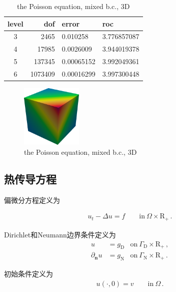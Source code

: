 \begin{table}[!htbp]\label{tab:4.1.1:2}
  \centering
  \begin{tabular}{c|r|l|l}
    level    &      dof   &         error  &         roc \\
    \hline
    3      &        2465  &         0.010258    &    3.776857087 \\
    \hline
    4      &        17985 &         0.0026009  &     3.944019378 \\
    \hline
    5      &        137345   &      0.00065152  &    3.992049361 \\
    \hline
   6      &        1073409   &     0.00016299  &    3.997300448
  \end{tabular}
  \caption{the Poisson equation, mixed b.c., 3D}
\end{table}

\begin{figure}[!htbp]
  \centering
  \includegraphics[height=3cm]{fig/4/fig:1.1.1:2.png}
  \caption{the Poisson equation, mixed b.c., 3D}
  \label{fig:4.1.1:2}
\end{figure}


\subsection{热传导方程}

偏微分方程定义为

\begin{align}
  u_t - \Delta u = f \qquad \mathrm{in}\ \Omega\times\mathrm R_+\,.
\end{align}

Dirichlet和Neumann边界条件定义为
\begin{subequations}	   
  \begin{align}	   
    u &= g_{\mathrm D} &\mathrm{on}\ \Gamma_{\mathrm D}\times\mathrm R_+\,,\\
    \partial_{\mathbf n}u & = g_{\mathrm N} &\mathrm{on}\ \Gamma_{\mathrm N}\times\mathrm R_+\,.
  \end{align}
\end{subequations}	   

初始条件定义为
\begin{align}		   
  u(\cdot,0) = v \qquad \mathrm{in}\ \Omega\,.
\end{align}

